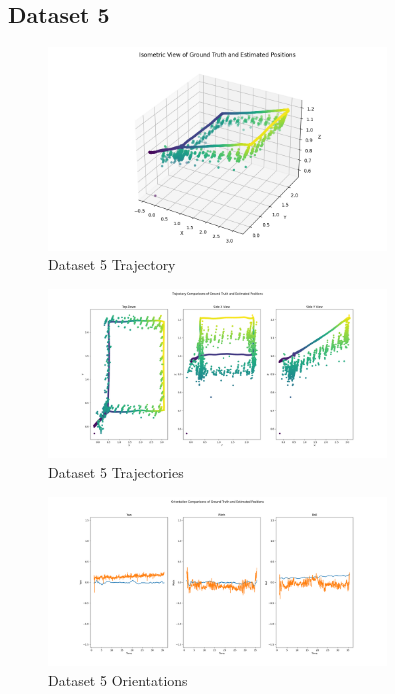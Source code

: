 \documentclass{article}
\begin{document}
\subsection*{Dataset 5}

\begin{figure}[H]
    \centering
    \includegraphics[width=0.8\textwidth]{./imgs/task4/studentdata5_ukf_isometric.png}
    \caption{Dataset 5 Trajectory}
\end{figure}

\begin{figure}[H]
    \centering
    \includegraphics[width=0.8\textwidth]{./imgs/task4/studentdata5_ukf_positions.png}
    \caption{Dataset 5 Trajectories}
\end{figure}

\begin{figure}[H]
    \centering
    \includegraphics[width=0.8\textwidth]{./imgs/task4/studentdata5_ukf_orientations.png}
    \caption{Dataset 5 Orientations}
\end{figure}
\end{document}
